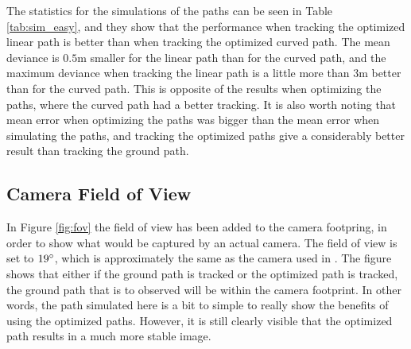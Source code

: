 The statistics for the simulations of the paths can be seen in Table \ref{tab:sim_easy}, and they show that the performance when tracking the optimized linear path is better than when tracking the optimized curved path. The mean deviance is $0.5$m smaller for the linear path than for the curved path, and the maximum deviance when tracking the linear path is a little more than $3$m better than for the curved path. This is opposite of the results when optimizing the paths, where the curved path had a better tracking. It is also worth noting that mean error when optimizing the paths was bigger than the mean error when simulating the paths, and tracking the optimized paths give a considerably better result than tracking the ground path.


\subsection{Camera Field of View}

In Figure \ref{fig:fov} the field of view has been added to the camera footpring, in order to show what would be captured by an actual camera. The field of view is set to $19\degree$, which is approximately the same as the camera used in \cite{hymsySUOMALAINEN}. The figure shows that either if the ground path is tracked or the optimized path is tracked, the ground path that is to observed will be within the camera footprint. In other words, the path simulated here is a bit to simple to really show the benefits of using the optimized paths. However, it is still clearly visible that the optimized path results in a much more stable image.

